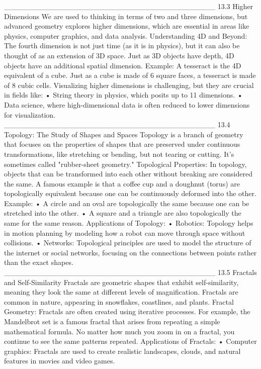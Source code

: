 ________________________________________
13.3 Higher Dimensions
We are used to thinking in terms of two and three dimensions, but advanced geometry explores higher dimensions, which are essential in areas like physics, computer graphics, and data analysis.
Understanding 4D and Beyond:
The fourth dimension is not just time (as it is in physics), but it can also be thought of as an extension of 3D space. Just as 3D objects have depth, 4D objects have an additional spatial dimension.
Example: A tesseract is the 4D equivalent of a cube. Just as a cube is made of 6 square faces, a tesseract is made of 8 cubic cells.
Visualizing higher dimensions is challenging, but they are crucial in fields like:
•	String theory in physics, which posits up to 11 dimensions.
•	Data science, where high-dimensional data is often reduced to lower dimensions for visualization.
________________________________________
13.4 Topology: The Study of Shapes and Spaces
Topology is a branch of geometry that focuses on the properties of shapes that are preserved under continuous transformations, like stretching or bending, but not tearing or cutting. It’s sometimes called "rubber-sheet geometry."
Topological Properties:
In topology, objects that can be transformed into each other without breaking are considered the same. A famous example is that a coffee cup and a doughnut (torus) are topologically equivalent because one can be continuously deformed into the other.
Example:
•	A circle and an oval are topologically the same because one can be stretched into the other.
•	A square and a triangle are also topologically the same for the same reason.
Applications of Topology:
•	Robotics: Topology helps in motion planning by modeling how a robot can move through space without collisions.
•	Networks: Topological principles are used to model the structure of the internet or social networks, focusing on the connections between points rather than the exact shapes.
________________________________________
13.5 Fractals and Self-Similarity
Fractals are geometric shapes that exhibit self-similarity, meaning they look the same at different levels of magnification. Fractals are common in nature, appearing in snowflakes, coastlines, and plants.
Fractal Geometry:
Fractals are often created using iterative processes. For example, the Mandelbrot set is a famous fractal that arises from repeating a simple mathematical formula. No matter how much you zoom in on a fractal, you continue to see the same patterns repeated.
Applications of Fractals:
•	Computer graphics: Fractals are used to create realistic landscapes, clouds, and natural features in movies and video games.
